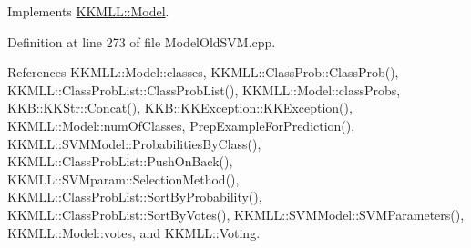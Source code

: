 Implements \hyperlink{class_k_k_m_l_l_1_1_model_a8d5638034838f63a5091978166d99d04}{K\+K\+M\+L\+L\+::\+Model}.



Definition at line 273 of file Model\+Old\+S\+V\+M.\+cpp.



References K\+K\+M\+L\+L\+::\+Model\+::classes, K\+K\+M\+L\+L\+::\+Class\+Prob\+::\+Class\+Prob(), K\+K\+M\+L\+L\+::\+Class\+Prob\+List\+::\+Class\+Prob\+List(), K\+K\+M\+L\+L\+::\+Model\+::class\+Probs, K\+K\+B\+::\+K\+K\+Str\+::\+Concat(), K\+K\+B\+::\+K\+K\+Exception\+::\+K\+K\+Exception(), K\+K\+M\+L\+L\+::\+Model\+::num\+Of\+Classes, Prep\+Example\+For\+Prediction(), K\+K\+M\+L\+L\+::\+S\+V\+M\+Model\+::\+Probabilities\+By\+Class(), K\+K\+M\+L\+L\+::\+Class\+Prob\+List\+::\+Push\+On\+Back(), K\+K\+M\+L\+L\+::\+S\+V\+Mparam\+::\+Selection\+Method(), K\+K\+M\+L\+L\+::\+Class\+Prob\+List\+::\+Sort\+By\+Probability(), K\+K\+M\+L\+L\+::\+Class\+Prob\+List\+::\+Sort\+By\+Votes(), K\+K\+M\+L\+L\+::\+S\+V\+M\+Model\+::\+S\+V\+M\+Parameters(), K\+K\+M\+L\+L\+::\+Model\+::votes, and K\+K\+M\+L\+L\+::\+Voting.


